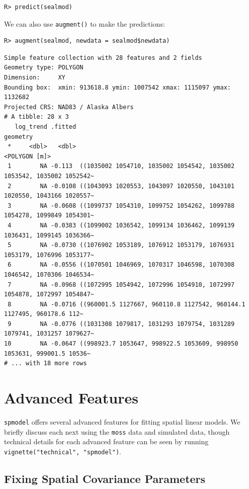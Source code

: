 \documentclass{article}
\begin{document}
\begin{verbatim}
R> predict(sealmod)
\end{verbatim}

We can also use \texttt{augment()} to make the predictions:

\begin{verbatim}
R> augment(sealmod, newdata = sealmod$newdata)
\end{verbatim}

\begin{verbatim}
Simple feature collection with 28 features and 2 fields
Geometry type: POLYGON
Dimension:     XY
Bounding box:  xmin: 913618.8 ymin: 1007542 xmax: 1115097 ymax: 1132682
Projected CRS: NAD83 / Alaska Albers
# A tibble: 28 x 3
   log_trend .fitted                                                              geometry
 *     <dbl>   <dbl>                                                         <POLYGON [m]>
 1        NA -0.113  ((1035002 1054710, 1035002 1054542, 1035002 1053542, 1035002 1052542~
 2        NA -0.0108 ((1043093 1020553, 1043097 1020550, 1043101 1020550, 1043166 1020557~
 3        NA -0.0608 ((1099737 1054310, 1099752 1054262, 1099788 1054278, 1099849 1054301~
 4        NA -0.0383 ((1099002 1036542, 1099134 1036462, 1099139 1036431, 1099145 1036366~
 5        NA -0.0730 ((1076902 1053189, 1076912 1053179, 1076931 1053179, 1076996 1053177~
 6        NA -0.0556 ((1070501 1046969, 1070317 1046598, 1070308 1046542, 1070306 1046534~
 7        NA -0.0968 ((1072995 1054942, 1072996 1054910, 1072997 1054878, 1072997 1054847~
 8        NA -0.0716 ((960001.5 1127667, 960110.8 1127542, 960144.1 1127495, 960178.6 112~
 9        NA -0.0776 ((1031308 1079817, 1031293 1079754, 1031289 1079741, 1031257 1079627~
10        NA -0.0647 ((998923.7 1053647, 998922.5 1053609, 998950 1053631, 999001.5 10536~
# ... with 18 more rows
\end{verbatim}

\hypertarget{sec:advfeatures}{%
\section{Advanced Features}\label{sec:advfeatures}}

\texttt{spmodel} offers several advanced features for fitting spatial
linear models. We briefly discuss each next using the \texttt{moss} data
and simulated data, though technical details for each advanced feature
can be seen by running \texttt{vignette("technical",\ "spmodel")}.

\hypertarget{fixing-spatial-covariance-parameters}{%
\subsection{Fixing Spatial Covariance
Parameters}\label{fixing-spatial-covariance-parameters}}
\end{document}
